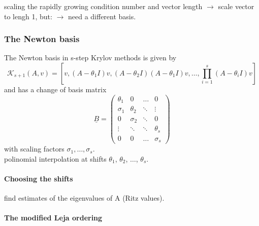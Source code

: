 \documentclass{scrartcl}
\begin{document}
scaling the rapidly growing condition number and vector length $\rightarrow$ scale vector to lengh 1, but:  $\rightarrow$ need a different basis.
\subsubsection{The Newton basis}
The Newton basis in s-step Krylov methods is given by 
\begin{equation*}
\mathcal{K}_{s + 1}(A, v) = \left[v, (A - \theta_1 I )v, (A - \theta_2 I )(A - \theta_1 I )v, \ldots, \displaystyle\prod_{i = 1}^s (A - \theta_i I )v\right]
\end{equation*}
and has a change of basis matrix
\begin{equation*}
\underline{B} = 
\begin{pmatrix}
\theta_1 & 0 & \ldots & 0 \\
\sigma_1 & \theta_2 & \ddots & \vdots \\
0 & \sigma_2 & \ddots & 0 \\
\vdots & \ddots & \ddots & \theta_s \\
0 & 0 & \ldots & \sigma_s 
\end{pmatrix}
\end{equation*}
with scaling factors $\sigma_1, \ldots, \sigma_s$.\\

polinomial interpolation at shifts $\theta_1$, $\theta_2$, $\ldots$, $\theta_s$.
\paragraph{Choosing the shifts}
find estimates of the eigenvalues of A (Ritz values).
\paragraph{The modified Leja ordering}
\end{document}
